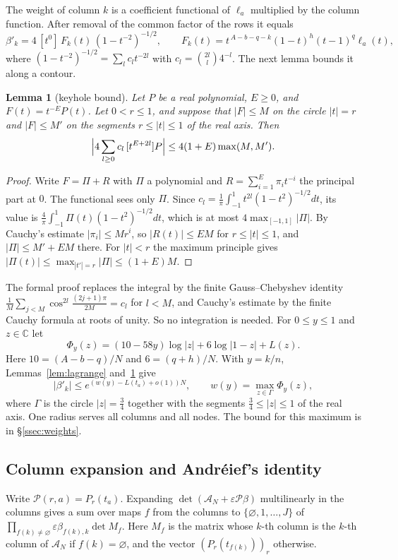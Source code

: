 \documentclass[11pt]{amsart}
\newtheorem{lemma}[theorem]{Lemma}
\theoremstyle{definition}
\theoremstyle{remark}
\numberwithin{equation}{section}
\newcommand{\C}{\mathbb C}
\newcommand{\cA}{\mathcal A}
\begin{document}
The weight of column $k$ is a
coefficient functional of $\ell_a$ multiplied by the column function. After removal of the common factor of
the rows it equals
\[
 \beta'_k=4\,[t^0]\,F_k(t)\,(1-t^{-2})^{-1/2},\qquad F_k(t)=t^{\,A-b-q-k}(1-t)^h(t-1)^q\ell_a(t),
\]
where $(1-t^{-2})^{-1/2}=\sum_lc_lt^{-2l}$ with $c_l=\binom{2l}l4^{-l}$. The next lemma bounds it along a contour.

\begin{lemma}[keyhole bound]\label{lem:keyhole}
Let $P$ be a real polynomial, $E\ge0$, and $F(t)=t^{-E}P(t)$. Let $0<r\le1$, and suppose that $|F|\le M$ on
the circle $|t|=r$ and $|F|\le M'$ on the segments $r\le|t|\le1$ of the real axis. Then
\[
 \Bigl|4\sum_{l\ge0}c_l\,[t^{E+2l}]P\Bigr|\le4(1+E)\max(M,M').
\]
\end{lemma}

\begin{proof}
Write $F=\Pi+R$ with $\Pi$ a polynomial and $R=\sum_{i=1}^E\pi_it^{-i}$ the principal part at $0$. The
functional sees only $\Pi$. Since $c_l=\frac1\pi\int_{-1}^1t^{2l}(1-t^2)^{-1/2}dt$, its value is
$\frac4\pi\int_{-1}^1\Pi(t)(1-t^2)^{-1/2}dt$, which is at most $4\max_{[-1,1]}|\Pi|$. By Cauchy's estimate
$|\pi_i|\le Mr^i$, so $|R(t)|\le EM$ for $r\le|t|\le1$, and $|\Pi|\le M'+EM$ there. For $|t|<r$ the maximum
principle gives $|\Pi(t)|\le\max_{|t'|=r}|\Pi|\le(1+E)M$.
\end{proof}

The formal proof replaces the integral by the finite Gauss--Chebyshev identity
$\frac1M\sum_{j<M}\cos^{2l}\frac{(2j+1)\pi}{2M}=c_l$ for $l<M$, and Cauchy's estimate by the finite Cauchy formula
at roots of unity. So no integration is needed. For $0\le y\le1$ and $z\in\C$ let
\[
 \Phi_y(z)=(10-58y)\log|z|+6\log|1-z|+L(z).
\]
Here $10=(A-b-q)/N$ and $6=(q+h)/N$. With $y=k/n$, Lemmas~\ref{lem:lagrange} and~\ref{lem:keyhole} give
\begin{equation}\label{eq:wk}
 |\beta'_k|\le e^{(w(y)-L(t_a)+o(1))N},\qquad w(y)=\max_{z\in\Gamma}\Phi_y(z),
\end{equation}
where $\Gamma$ is the circle $|z|=\frac34$ together with the segments $\frac34\le|z|\le1$ of the real axis. One
radius serves all columns and all nodes. The bound for this maximum is in \S\ref{ssec:weights}.

\subsection{Column expansion and Andr\'eief's identity}\label{ssec:andreief}
Write $\mathcal P(r,a)=P_r(t_a)$. Expanding $\det(\cA_N+\varepsilon\mathcal P\beta)$ multilinearly in the
columns gives a sum over maps $f$ from the columns to $\{\varnothing,1,\ldots,J\}$ of
$\prod_{f(k)\ne\varnothing}\varepsilon\beta_{f(k),k}\det M_f$. Here $M_f$ is the matrix whose $k$-th column is
the $k$-th column of $\cA_N$ if $f(k)=\varnothing$, and the vector $(P_r(t_{f(k)}))_r$ otherwise.
\end{document}
